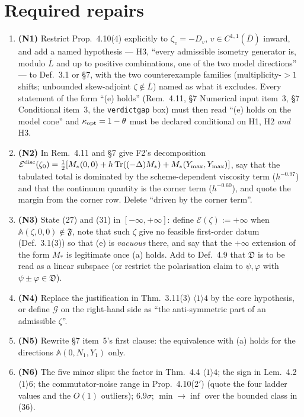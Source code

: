 \documentclass[11pt]{article}
\newcommand{\Aop}{\mathbb A}
\begin{document}
\section{Required repairs}\label{sec:req}
\begin{enumerate}[leftmargin=2.6em,itemsep=1pt,label=\textbf{S\arabic*.}]
\item \textbf{(N1)} Restrict Prop.~4.10(4) explicitly to $\zeta_v=-D_v$, $v\in C^{1,1}(\overline D)$
 inward, and add a named hypothesis --- H3, ``every admissible isometry generator is,
 modulo $\overline L$ and up to positive combinations, one of the two model directions''
 --- to Def.~3.1 or \S7, with the two counterexample families (multiplicity-$>1$ shifts;
 unbounded skew-adjoint $\zeta\notin\overline L$) named as what it excludes.  Every
 statement of the form ``(e) holds'' (Rem.~4.11, \S7 Numerical input item~3, \S7
 Conditional item~3, the \texttt{verdictgap} box) must then read ``(e) holds on the model
 cone'' and $\kappa_{\rm opt}=1-\theta$ must be declared conditional on H1, H2 \emph{and} H3.
\item \textbf{(N2)} In Rem.~4.11 and \S7 give F2's decomposition
 $\mathcal E^{\rm disc}(\zeta_0)=\frac12[M_*(0,0)+h\operatorname{Tr}((-\Delta)M_*)+M_*(Y_{\max},Y_{\max})]$,
 say that the tabulated total is dominated by the scheme-dependent viscosity term
 ($h^{-0.97}$) and that the continuum quantity is the corner term ($h^{-0.60}$), and quote
 the margin from the corner row.  Delete ``driven by the corner term''.
\item \textbf{(N3)} State (27) and (31) in $[-\infty,+\infty]$: define
 $\mathcal E(\zeta):=+\infty$ when $\Aop(\zeta,0,0)\notin\mathfrak F$, note that such
 $\zeta$ give no feasible first-order datum (Def.~3.1(3)) so that (e) is \emph{vacuous}
 there, and say that the $+\infty$ extension of the form $M_*$ is legitimate once (a)
 holds.  Add to Def.~4.9 that $\mathfrak D$ is to be read as a linear subspace (or restrict
 the polarisation claim to $\psi,\varphi$ with $\psi\pm\varphi\in\mathfrak D$).
\item \textbf{(N4)} Replace the justification in Thm.~3.11(3) $\langle1\rangle4$ by the
 core hypothesis, or define $\mathcal G$ on the right-hand side as ``the anti-symmetric part
 of an admissible $\zeta$''.
\item \textbf{(N5)} Rewrite \S7 item~5's first clause: the equivalence with (a) holds for
 the directions $\Aop(0,N_1,Y_1)$ only.
\item \textbf{(N6)} The five minor slips: the factor in Thm.~4.4 $\langle1\rangle4$; the
 sign in Lem.~4.2 $\langle1\rangle6$; the commutator-noise range in Prop.~4.10(2$'$)
 (quote the four ladder values and the $O(1)$ outliers); $6.9\sigma$; $\min\to\inf$ over
 the bounded class in (36).
\end{enumerate}
\end{document}
